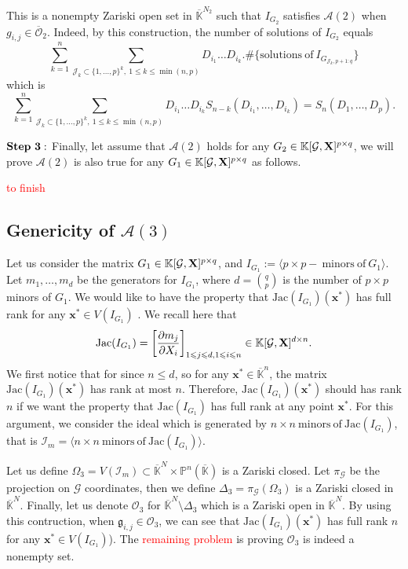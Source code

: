 \documentclass[11pt]{article}
\numberwithin{Property}{section}
\numberwithin{Theorem}{section}
\numberwithin{Proposition}{section}
\numberwithin{Lemma}{section}
\numberwithin{Corollary}{section}
\numberwithin{Definition}{section}
\numberwithin{Remark}{section}
\numberwithin{Conjecture}{section}
\numberwithin{Problem}{section}
\numberwithin{Example}{section}
\numberwithin{Claim}{section}
\renewcommand{\leq}{\leqslant}
\def\bar{\overline}
\newcommand{\field}{\mathbb{K}} %
\newcommand{\mat}[1]{\mathbf{\MakeUppercase{#1}}} %
\newcommand{\todo}[1]{\textcolor{red}{#1}} %
\begin{document}
This is a nonempty Zariski open set in $\bar{\field}^{N_2}$ such that $I_{G_2}$ satisfies $\mathcal{A}(2)$ when $g_{i,j} \in \bar{\mathcal{O}}_2$. Indeed, by this construction, the number of solutions of $I_{G_2}$ equals
\[\sum_{k=1}^n \sum_{\mathcal{J}_k \subset\{1, \ldots, p\}^k, \ 1 \leq k \leq \min(n,p)}D_{i_1} \ldots D_{i_k} . \# \{\mathrm{solutions \ of \ } I_{G_{\mathcal{J}_k, p+1:q}}\}\] which is 
\[
\sum_{k=1}^n \sum_{\mathcal{J}_k \subset\{1, \ldots, p\}^k, \ 1 \leq k \leq \min(n,p)}D_{i_1} \ldots D_{i_k}S_{n-k}(D_{i_1}, \ldots, D_{i_k}) = S_n(D_1, \ldots, D_p). 
\]

$\bf{Step \ 3:}$ Finally, let assume that $\mathcal{A}(2)$ holds for any $G_2 \in \field[\mathcal{G}, \mat{X}]^{p \times q}$, we will prove $\mathcal{A}(2)$ is also true for any $G_1 \in \field[\mathcal{G}, \mat{X}]^{p \times q}$ as follows.

\todo{to finish}
\subsection{Genericity of $\mathcal{A}(3)$} Let us consider the matrix $G_1 \in \field[\mathcal{G}, \mat{X}]^{p \times q}$, and $I_{G_1} := \langle p \times p - \ \mathrm{minors \ of } \ G_1 \rangle$. Let $m_1, \ldots, m_d$ be the generators for $I_{G_1}$, where $d = {{q}\choose{p}}$ is the number of $p \times p$ minors of $G_1$. We would like to have the property that $\mathrm{Jac}(I_{G_1})(\mathbf{x}^*)$ has full rank for any $\mathbf{x}^* \in V(I_{G_1})$ . We recall here that $$\mathrm{Jac}(I_{G_1}) = \left[\frac{\partial m_j}{\partial X_i}\right]_{1 \leq j \leq d, 1 \leq i \leq n} \in \field[\mathcal{G}, \mat{X}]^{d \times n}. $$
We first notice that for since $n \leq d$, so for any $\mathbf{x}^* \in \bar{\field}^n$, the matrix $\mathrm{Jac}(I_{G_1})(\mathbf{x}^*)$ has rank at most $n$. Therefore, $\mathrm{Jac}(I_{G_1})(\mathbf{x}^*)$ should has rank $n$ if we want the property that $\mathrm{Jac}(I_{G_1})$ has full rank at any point $\mathbf{x}^*$. For this argument, we consider the ideal which is generated by $n \times n \ \mathrm{minors \ of} \ \mathrm{Jac}(I_{G_1})$, that is $\mathcal{I}_{m} = \langle n \times n  \ \mathrm{minors \ of} \ \mathrm{Jac}(I_{G_1}) \rangle$.

Let us define $\Omega_3 = V(\mathcal{I}_m) \subset \bar{\field}^N \times \mathbb{P}^n(\bar{\field})$ is a Zariski closed. Let $\pi_{\mathcal{G}}$ be the projection on $\mathcal{G}$ coordinates, then we define $\Delta_3 = \pi_{\mathcal{G}}(\Omega_3)$ is a Zariski closed in $\bar{\field}^N $. Finally, let us denote  $\mathcal{O}_3$ for $\bar{\field}^N \setminus \Delta_3$ which is a Zariski open in $\bar{\field}^N $. By using this contruction, when $\mathfrak{g}_{i,j} \in \mathcal{O}_3$, we can see that  $\mathrm{Jac}(I_{G_1})(\mathbf{x}^*)$ has full rank $n$ for any $\mathbf{x}^* \in V(I_{G_1})$). The \todo{remaining problem } is proving $\mathcal{O}_3$ is indeed a nonempty set. 
\end{document}
